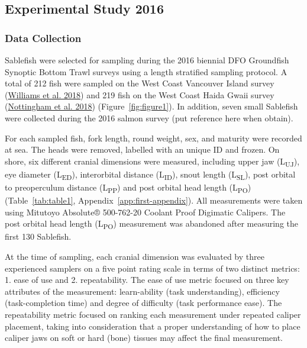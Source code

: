 \documentclass[12pt]{article}\usepackage[]{graphicx}\usepackage[]{color}
\begin{document}
\hypertarget{experimental-study-2016}{%
\subsection{Experimental Study 2016}\label{experimental-study-2016}}

\hypertarget{data-collection}{%
\subsubsection{Data Collection}\label{data-collection}}

Sablefish were selected for sampling during the 2016 biennial DFO Groundfish Synoptic Bottom Trawl surveys using a length stratified sampling protocol. A total of 212 fish were sampled on the West Coast Vancouver Island survey (\protect\hyperlink{ref-Williams2018}{Williams et al. 2018}) and 219 fish on the West Coast Haida Gwaii survey (\protect\hyperlink{ref-Nottingham2018}{Nottingham et al. 2018}) (Figure~\ref{fig:figure1}). In addition, seven small Sablefish were collected during the 2016 salmon survey (put reference here when obtain).

For each sampled fish, fork length, round weight, sex, and maturity were recorded at sea. The heads were removed, labelled with an unique ID and frozen. On shore, six different cranial dimensions were measured, including upper jaw (L\textsubscript{UJ}), eye diameter (L\textsubscript{ED}), interorbital distance (L\textsubscript{ID}), snout length (L\textsubscript{SL}), post orbital to preoperculum distance (L\textsubscript{PP}) and post orbital head length (L\textsubscript{PO}) (Table~\ref{tab:table1}, Appendix~\ref{app:first-appendix}). All measurements were taken using Mitutoyo Absolute® 500-762-20 Coolant Proof Digimatic Calipers. The post orbital head length (L\textsubscript{PO}) measurement was abandoned after measuring the first 130 Sablefish.

At the time of sampling, each cranial dimension was evaluated by three experienced samplers on a five point rating scale in terms of two distinct metrics: 1. ease of use and 2. repeatability. The ease of use metric focused on three key attributes of the measurement: learn-ability (task understanding), efficiency (task-completion time) and degree of difficulty (task performance ease). The repeatability metric focused on ranking each measurement under repeated caliper placement, taking into consideration that a proper understanding of how to place caliper jaws on soft or hard (bone) tissues may affect the final measurement.
\end{document}
